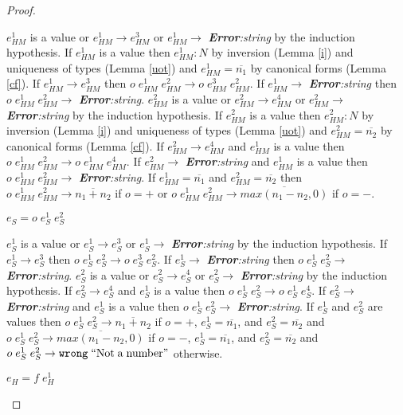 \begin{theorem}
\begin{proof}
\begin{case}
$e_{HM}^{1}$ is a value or $e_{HM}^{1}\rightarrow e_{HM}^{3}$ or $e_{HM}^{1}\rightarrow$ \emph{\textbf{Error}:\;string} by the induction hypothesis.  If $e_{HM}^{1}$ is a value then $e_{HM}^{1}:N$ by inversion (Lemma \ref{i}) and uniqueness of types (Lemma \ref{uot}) and $e_{HM}^{1}=\overline{n_{1}}$ by canonical forms (Lemma \ref{cf}).  If $e_{HM}^{1}\rightarrow e_{HM}^{3}$ then $o\;e_{HM}^{1}\;e_{HM}^{2}\rightarrow o\;e_{HM}^{3}\;e_{HM}^{2}$.  If $e_{HM}^{1}\rightarrow$ \emph{\textbf{Error}:\;string} then $o\;e_{HM}^{1}\;e_{HM}^{2}\rightarrow$ \emph{\textbf{Error}:\;string}.  $e_{HM}^{2}$ is a value or $e_{HM}^{2}\rightarrow e_{HM}^{4}$ or $e_{HM}^{2}\rightarrow$ \emph{\textbf{Error}:\;string} by the induction hypothesis.  If $e_{HM}^{2}$ is a value then $e_{HM}^{2}:N$ by inversion (Lemma \ref{i}) and uniqueness of types (Lemma \ref{uot}) and $e_{HM}^{2}=\overline{n_{2}}$ by canonical forms (Lemma \ref{cf}).  If $e_{HM}^{2}\rightarrow e_{HM}^{4}$ and $e_{HM}^{1}$ is a value then $o\;e_{HM}^{1}\;e_{HM}^{2}\rightarrow o\;e_{HM}^{1}\;e_{HM}^{4}$.  If $e_{HM}^{2}\rightarrow$ \emph{\textbf{Error}:\;string} and $e_{HM}^{1}$ is a value then $o\;e_{HM}^{1}\;e_{HM}^{2}\rightarrow$ \emph{\textbf{Error}:\;string}.  If $e_{HM}^{1}=\overline{n_{1}}$ and $e_{HM}^{2}=\overline{n_{2}}$ then $o\;e_{HM}^{1}\;e_{HM}^{2}\rightarrow\overline{n_{1}+n_{2}}$ if $o=+$ or $o\;e_{HM}^{1}\;e_{HM}^{2}\rightarrow\overline{max(n_{1}-n_{2},0)}$ if $o=-$.
\end{case}
\begin{case}
$e_{S}=o\;e_{S}^{1}\;e_{S}^{2}$

$e_{S}^{1}$ is a value or $e_{S}^{1}\rightarrow e_{S}^{3}$ or $e_{S}^{1}\rightarrow$ \emph{\textbf{Error}:\;string} by the induction hypothesis.  If $e_{S}^{1}\rightarrow e_{S}^{3}$ then $o\;e_{S}^{1}\;e_{S}^{2}\rightarrow o\;e_{S}^{3}\;e_{S}^{2}$.  If $e_{S}^{1}\rightarrow$ \emph{\textbf{Error}:\;string} then $o\;e_{S}^{1}\;e_{S}^{2}\rightarrow$ \emph{\textbf{Error}:\;string}.  $e_{S}^{2}$ is a value or $e_{S}^{2}\rightarrow e_{S}^{4}$ or $e_{S}^{2}\rightarrow$ \emph{\textbf{Error}:\;string} by the induction hypothesis.  If $e_{S}^{2}\rightarrow e_{S}^{4}$ and $e_{S}^{1}$ is a value then $o\;e_{S}^{1}\;e_{S}^{2}\rightarrow o\;e_{S}^{1}\;e_{S}^{4}$.  If $e_{S}^{2}\rightarrow$ \emph{\textbf{Error}:\;string} and $e_{S}^{1}$ is a value then $o\;e_{S}^{1}\;e_{S}^{2}\rightarrow$ \emph{\textbf{Error}:\;string}.  If $e_{S}^{1}$ and $e_{S}^{2}$ are values then $o\;e_{S}^{1}\;e_{S}^{2}\rightarrow\overline{n_{1}+n_{2}}$ if $o=+$, $e_{S}^{1}=\overline{n_{1}}$, and $e_{S}^{2}=\overline{n_{2}}$ and $o\;e_{S}^{1}\;e_{S}^{2}\rightarrow\overline{max(n_{1}-n_{2},0)}$ if $o=-$, $e_{S}^{1}=\overline{n_{1}}$, and $e_{S}^{2}=\overline{n_{2}}$ and $o\;e_{S}^{1}\;e_{S}^{2}\rightarrow\mathtt{wrong}\;\mathrm{``Not\;a\;number"}$ otherwise.
\end{case}
\begin{case}
$e_{H}=f\;e_{H}^{1}$


\end{case}
\end{proof}
\end{theorem}
